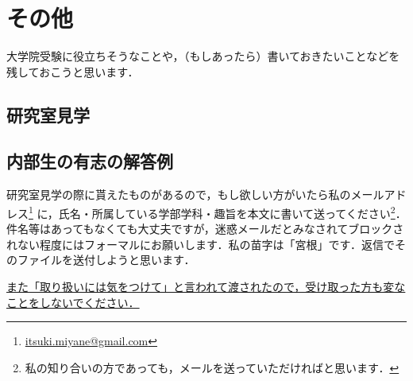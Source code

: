 \documentclass[a4paper,pdflatex,ja=standard]{bxjsarticle}
\begin{document}
\section{その他}

大学院受験に役立ちそうなことや，（もしあったら）書いておきたいことなどを残しておこうと思います．

\subsection{研究室見学}




\subsection{内部生の有志の解答例}

研究室見学の際に貰えたものがあるので，もし欲しい方がいたら私のメールアドレス\footnote{
  \href{mailto:itsuki.miyane@gmail.com}{itsuki.miyane@gmail.com}
}
に，氏名・所属している学部学科・趣旨を本文に書いて送ってください\footnote{
  私の知り合いの方であっても，メールを送っていただければと思います．
}．件名等はあってもなくても大丈夫ですが，迷惑メールだとみなされてブロックされない程度にはフォーマルにお願いします．私の苗字は「宮根」です．返信でそのファイルを送付しようと思います．

\uline{また「取り扱いには気をつけて」と言われて渡されたので，受け取った方も変なことをしないでください．}     
      
\end{document}
